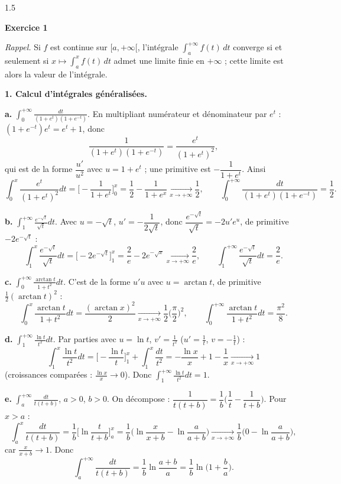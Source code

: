 \documentclass[12pt]{article}
\begin{document}
\begin{spacing}{1.5}

\textbf{Exercice 1}

\emph{Rappel.} Si $f$ est continue sur $[a,+\infty[$, l'intégrale $\int_a^{+\infty}f(t)\,dt$ converge si et seulement si $x\mapsto\int_a^xf(t)\,dt$ admet une limite finie en $+\infty$ ; cette limite est alors la valeur de l'intégrale.

\textbf{1. Calcul d'intégrales généralisées.}

\textbf{a.} $\displaystyle\int_0^{+\infty}\frac{dt}{(1+e^t)(1+e^{-t})}$. En multipliant numérateur et dénominateur par $e^t$ : $(1+e^{-t})e^t=e^t+1$, donc
\[
\frac{1}{(1+e^t)(1+e^{-t})}=\frac{e^t}{(1+e^t)^2},
\]
qui est de la forme $\dfrac{u'}{u^2}$ avec $u=1+e^t$ ; une primitive est $-\dfrac{1}{1+e^t}$. Ainsi
\[
\int_0^x\frac{e^t}{(1+e^t)^2}dt=\Big[-\frac1{1+e^t}\Big]_0^x=\frac12-\frac1{1+e^x}\xrightarrow[x\to+\infty]{}\frac12,\qquad\boxed{\int_0^{+\infty}\frac{dt}{(1+e^t)(1+e^{-t})}=\frac12}.
\]

\textbf{b.} $\displaystyle\int_1^{+\infty}\frac{e^{-\sqrt t}}{\sqrt t}dt$. Avec $u=-\sqrt t$, $u'=-\dfrac1{2\sqrt t}$, donc $\dfrac{e^{-\sqrt t}}{\sqrt t}=-2u'e^u$, de primitive $-2e^{-\sqrt t}$ :
\[
\int_1^x\frac{e^{-\sqrt t}}{\sqrt t}dt=\Big[-2e^{-\sqrt t}\Big]_1^x=\frac2e-2e^{-\sqrt x}\xrightarrow[x\to+\infty]{}\frac2e,\qquad\boxed{\int_1^{+\infty}\frac{e^{-\sqrt t}}{\sqrt t}dt=\frac2e}.
\]

\textbf{c.} $\displaystyle\int_0^{+\infty}\frac{\arctan t}{1+t^2}dt$. C'est de la forme $u'u$ avec $u=\arctan t$, de primitive $\frac12(\arctan t)^2$ :
\[
\int_0^x\frac{\arctan t}{1+t^2}dt=\frac{(\arctan x)^2}{2}\xrightarrow[x\to+\infty]{}\frac12\Big(\frac\pi2\Big)^2,\qquad\boxed{\int_0^{+\infty}\frac{\arctan t}{1+t^2}dt=\frac{\pi^2}{8}}.
\]

\textbf{d.} $\displaystyle\int_1^{+\infty}\frac{\ln t}{t^2}dt$. Par parties avec $u=\ln t$, $v'=\frac1{t^2}$ ($u'=\frac1t$, $v=-\frac1t$) :
\[
\int_1^x\frac{\ln t}{t^2}dt=\Big[-\frac{\ln t}{t}\Big]_1^x+\int_1^x\frac{dt}{t^2}=-\frac{\ln x}{x}+1-\frac1x\xrightarrow[x\to+\infty]{}1
\]
(croissances comparées : $\frac{\ln x}{x}\to0$). Donc $\boxed{\displaystyle\int_1^{+\infty}\frac{\ln t}{t^2}dt=1}$.

\textbf{e.} $\displaystyle\int_a^{+\infty}\frac{dt}{t(t+b)}$, $a>0$, $b>0$. On décompose : $\dfrac1{t(t+b)}=\dfrac1b\Big(\dfrac1t-\dfrac1{t+b}\Big)$. Pour $x>a$ :
\[
\int_a^x\frac{dt}{t(t+b)}=\frac1b\Big[\ln\frac{t}{t+b}\Big]_a^x=\frac1b\Big(\ln\frac{x}{x+b}-\ln\frac{a}{a+b}\Big)\xrightarrow[x\to+\infty]{}\frac1b\Big(0-\ln\frac{a}{a+b}\Big),
\]
car $\frac{x}{x+b}\to1$. Donc
\[
\boxed{\int_a^{+\infty}\frac{dt}{t(t+b)}=\frac1b\ln\frac{a+b}{a}=\frac1b\ln\Big(1+\frac ba\Big)}.
\]


\end{spacing}
\end{document}
